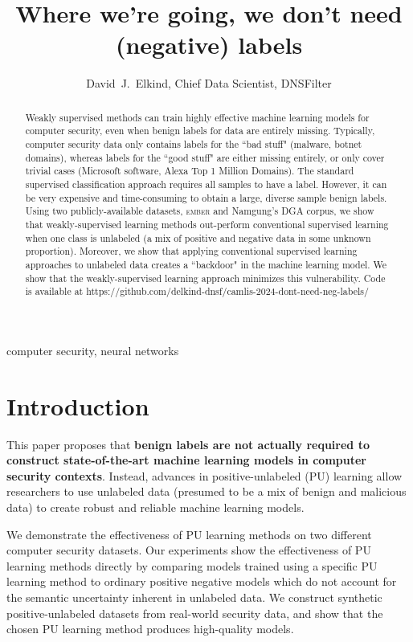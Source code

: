 \documentclass[conference]{IEEEtran}
\begin{document}
\title{Where we're going, we don't need (negative) labels}

\author{David~J.~Elkind, Chief Data Scientist, DNSFilter}

\maketitle

\begin{abstract}
    Weakly supervised methods can train highly effective machine learning models for computer security, even when benign labels for data are entirely missing. Typically, computer security data only contains labels for the ``bad stuff" (malware, botnet domains), whereas labels for the ``good stuff" are either missing entirely, or only cover trivial cases (Microsoft software, Alexa Top 1 Million Domains). The standard supervised classification approach requires all samples to have a label. However, it can be very expensive and time-consuming to obtain a large, diverse sample benign labels. Using two publicly-available datasets, \textsc{ember} and Namgung's DGA corpus, we show that weakly-supervised learning methods out-perform conventional supervised learning when one class is unlabeled (a mix of positive and negative data in some unknown proportion). Moreover, we show that applying conventional supervised learning approaches to unlabeled data creates a ``backdoor" in the machine learning model. We show that the weakly-supervised learning approach minimizes this vulnerability. Code is available at https://github.com/delkind-dnsf/camlis-2024-dont-need-neg-labels/
\end{abstract}

\begin{IEEEkeywords}
computer security, neural networks
\end{IEEEkeywords}

\section{Introduction}
    This paper proposes that \textbf{benign labels are not actually required to construct state-of-the-art machine learning models in computer security contexts}. Instead, advances in positive-unlabeled (PU) learning allow researchers to use unlabeled data (presumed to be a mix of benign and malicious data) to create robust and reliable machine learning models.

    We demonstrate the effectiveness of PU learning methods on two different computer security datasets. Our experiments show the effectiveness of PU learning methods directly by comparing models trained using a specific PU learning method to ordinary positive negative models which do not account for the semantic uncertainty inherent in unlabeled data. We construct synthetic positive-unlabeled datasets from real-world security data, and show that the chosen PU learning method produces high-quality models.
\end{document}
